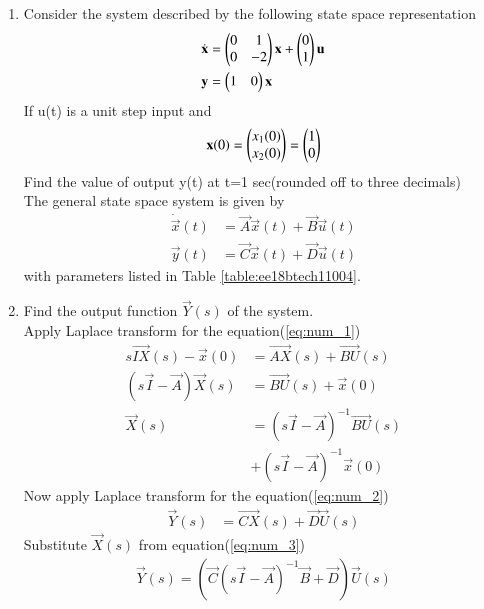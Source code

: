 \begin{enumerate}[label=\thesubsection.\arabic*.,ref=\thesubsection.\theenumi]

\item
Consider the system described by the following state space representation  
\begin{align}
\dot{\mathbf{ x}}&=\begin{pmatrix}0&1\\0&-2\end{pmatrix}\mathbf{x} + \begin{pmatrix}0\\1\end{pmatrix}\mathbf{u}\\  
\mathbf{y} &= \begin{pmatrix}1&0\end{pmatrix}\mathbf{x}
\end{align}
If u(t) is a unit step input and 
\begin{align}
\mathbf{x}(0)=\begin{pmatrix}x_{1}(0)\\x_{2}(0)\end{pmatrix}=\begin{pmatrix}1\\0\end{pmatrix}
\end{align}
Find the value of output y(t) at t=1 sec(rounded off to three decimals)
\\
\solution The general state space system is given by
\begin{align}
\dot{\vec{x}}(t)&=\vec{A}\vec{x}(t)+\vec{B}\vec{u}(t) \label{eq:num_1}\\
 \vec{y}(t)&=\vec{C}\vec{x}(t)+\vec{D} \vec{u}(t) \label{eq:num_2}
\end{align}
with parameters listed in Table \ref{table:ee18btech11004}.
\begin{table}[!ht]
\centering

\caption{}
\label{table:ee18btech11004}
\end{table}
\item Find the output function $\vec{Y}(s)$ of the system.
\\
\solution Apply Laplace transform for the equation(\ref{eq:num_1})
\begin{align}
 s\vec{IX}(s)-\vec{x}(0)&= \vec{AX}(s)+ \vec{BU}(s)\\
(s\vec{I}-\vec{A})\vec{X}(s)&= \vec{BU}(s)+ \vec{x}(0)\\
\vec{X}(s)&={(s\vec{I}-\vec{A})^{-1}}\vec{B U}(s)\\ &+(s\vec{I}-\vec{A})^{-1}\vec{x}(0) \label{eq:num_3}
\end{align}
Now apply Laplace transform for the equation(\ref{eq:num_2})
\begin{align}
    \vec{Y}(s)&= \vec{CX}(s)+\vec{D}\vec{U}(s)
\end{align}
Substitute $\vec{X}(s)$ from equation(\ref{eq:num_3})
\begin{multline}
\vec{Y}(s)=( \vec{C}{(s\vec{I}-\vec{A})^{-1}}\vec{B}+\vec{D}) \vec{U}(s) 

\end{multline}
\end{enumerate}
